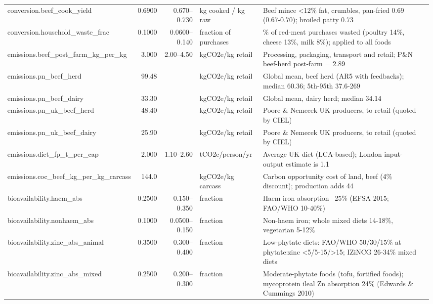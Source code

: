 \begin{longtable}{>{\raggedright\arraybackslash}p{4.2cm}rr>{\raggedright\arraybackslash}p{2.2cm}>{\raggedright\arraybackslash}p{5.4cm}l}
conversion.beef\_cook\_yield & 0.6900 & 0.670--0.730 & kg cooked / kg raw & Beef mince <12\% fat, crumbles, pan-fried 0.69 (0.67-0.70); broiled patty 0.73 & \cite{showell2012} \\
conversion.household\_waste\_frac & 0.1000 & 0.0600--0.140 & fraction of purchases & 10\% of red-meat purchases wasted (poultry 14\%, cheese 13\%, milk 8\%); applied to all foods & \cite{defra2010waste} \\
emissions.beef\_post\_farm\_kg\_per\_kg & 3.000 & 2.00--4.50 & kgCO2e/kg retail & Processing, packaging, transport and retail; P\&N beef-herd post-farm = 2.89 & \cite{poore2018} \\
emissions.pn\_beef\_herd & 99.48 &  & kgCO2e/kg retail & Global mean, beef herd (AR5 with feedbacks); median 60.36; 5th-95th 37.6-269 & \cite{poore2018} \\
emissions.pn\_beef\_dairy & 33.30 &  & kgCO2e/kg retail & Global mean, dairy herd; median 34.14 & \cite{poore2018} \\
emissions.pn\_uk\_beef\_herd & 48.40 &  & kgCO2e/kg retail & Poore \& Nemecek UK producers, to retail (quoted by CIEL) & \cite{ciel2020} \\
emissions.pn\_uk\_beef\_dairy & 25.90 &  & kgCO2e/kg retail & Poore \& Nemecek UK producers, to retail (quoted by CIEL) & \cite{ciel2020} \\
emissions.diet\_fp\_t\_per\_cap & 2.000 & 1.10--2.60 & tCO2e/person/yr & Average UK diet (LCA-based); London input-output estimate is 1.1 & \cite{scarborough2014} \\
emissions.coc\_beef\_kg\_per\_kg\_carcass & 144.0 &  & kgCO2e/kg carcass & Carbon opportunity cost of land, beef (4\% discount); production adds 44 & \cite{searchinger2018} \\
bioavailability.haem\_abs & 0.2500 & 0.150--0.350 & fraction & Haem iron absorption ~25\% (EFSA 2015; FAO/WHO 10-40\%) & \cite{efsa2015iron} \\
bioavailability.nonhaem\_abs & 0.1000 & 0.0500--0.150 & fraction & Non-haem iron; whole mixed diets 14-18\%, vegetarian 5-12\% & \cite{hurrell2010} \\
bioavailability.zinc\_abs\_animal & 0.3500 & 0.300--0.400 & fraction & Low-phytate diets: FAO/WHO 50/30/15\% at phytate:zinc <5/5-15/>15; IZiNCG 26-34\% mixed diets & \cite{fao2004vitmin} \\
bioavailability.zinc\_abs\_mixed & 0.2500 & 0.200--0.300 & fraction & Moderate-phytate foods (tofu, fortified foods); mycoprotein ileal Zn absorption 24\% (Edwards \& Cummings 2010) & \cite{efsa2014zinc} \\

\end{longtable}
